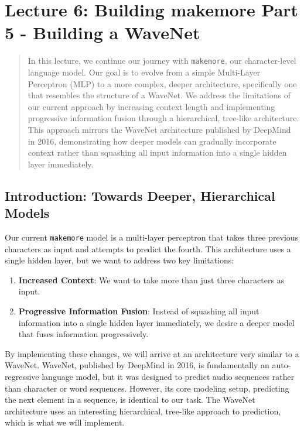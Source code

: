 
\section{Lecture 6: Building makemore Part 5 - Building a WaveNet}

\begin{abstract}
In this lecture, we continue our journey with \texttt{makemore}, our character-level language model. Our goal is to evolve from a simple Multi-Layer Perceptron (MLP) to a more complex, deeper architecture, specifically one that resembles the structure of a WaveNet. We address the limitations of our current approach by increasing context length and implementing progressive information fusion through a hierarchical, tree-like architecture. This approach mirrors the WaveNet architecture published by DeepMind in 2016, demonstrating how deeper models can gradually incorporate context rather than squashing all input information into a single hidden layer immediately.
\end{abstract}

\subsection{Introduction: Towards Deeper, Hierarchical Models}

Our current \texttt{makemore} model is a multi-layer perceptron that takes three previous characters as input and attempts to predict the fourth. This architecture uses a single hidden layer, but we want to address two key limitations:

\begin{enumerate}
    \item \textbf{Increased Context}: We want to take more than just three characters as input.
    \item \textbf{Progressive Information Fusion}: Instead of squashing all input information into a single hidden layer immediately, we desire a deeper model that fuses information progressively.
\end{enumerate}

By implementing these changes, we will arrive at an architecture very similar to a WaveNet. WaveNet, published by DeepMind in 2016, is fundamentally an auto-regressive language model, but it was designed to predict audio sequences rather than character or word sequences. However, its core modeling setup, predicting the next element in a sequence, is identical to our task. The WaveNet architecture uses an interesting hierarchical, tree-like approach to prediction, which is what we will implement.

